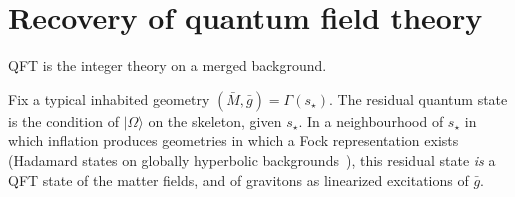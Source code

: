 \documentclass[11pt,a4paper]{article}
\theoremstyle{plain}
\theoremstyle{definition}
\theoremstyle{remark}
\newcommand{\ket}[1]{\lvert#1\rangle}
\begin{document}
\section{Recovery of quantum field theory}
\label{sec:qft}

QFT is the integer theory on a merged background.

Fix a typical inhabited geometry $(\bar{M},\bar{g})=\Gamma(s_{\star})$.
The residual quantum state is the condition of $\ket{\Omega}$ on the skeleton, given $s_{\star}$.
In a neighbourhood of $s_{\star}$ in which inflation produces geometries in which a Fock representation exists (Hadamard states on globally hyperbolic backgrounds~\cite{wald1994,kay1991}), this residual state \emph{is} a QFT state of the matter fields, and of gravitons as linearized excitations of $\bar{g}$.
\end{document}
